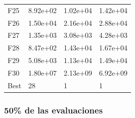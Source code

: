 \begin{table}[H]
\begin{minipage}{.5\linewidth}
\begin{tabular}{llll}
        F25  &  8.92e+02 &   1.02e+04 &  1.42e+04 \\
        F26  &  1.50e+04 &   2.16e+04 &  2.88e+04 \\
        F27  &  1.35e+03 &   3.08e+03 &  4.28e+03 \\
        F28  &  8.47e+02 &   1.43e+04 &  1.67e+04 \\
        F29  &  5.08e+03 &   1.13e+04 &  1.49e+04 \\
        F30  &  1.80e+07 &   2.13e+09 &  6.92e+09 \\
        Best &        28 &          1 &         1 \\
        \bottomrule
        \end{tabular}
        
    \end{minipage} 
\end{table}


\subsubsection*{50\% de las evaluaciones}


